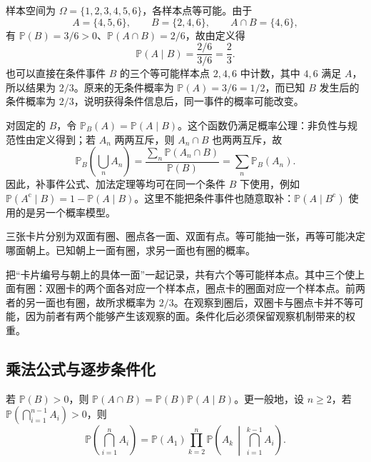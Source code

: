 \begin{solve}
样本空间为 $\Omega=\{1,2,3,4,5,6\}$，各样本点等可能。由于
\[
  A=\{4,5,6\},\qquad B=\{2,4,6\},\qquad A\cap B=\{4,6\},
\]
有 $\mathbb P(B)=3/6>0$、$\mathbb P(A\cap B)=2/6$，故由定义得
\[
  \mathbb P(A\mid B)=\frac{2/6}{3/6}=\frac23.
\]
也可以直接在条件事件 $B$ 的三个等可能样本点 $2,4,6$ 中计数，其中 $4,6$ 满足 $A$，所以结果为 $2/3$。原来的无条件概率为 $\mathbb P(A)=3/6=1/2$，而已知 $B$ 发生后的条件概率为 $2/3$，说明获得条件信息后，同一事件的概率可能改变。
\end{solve}

对固定的 $B$，令 $\mathbb P_B(A)=\mathbb P(A\mid B)$。这个函数仍满足概率公理：非负性与规范性由定义得到；若 $A_n$ 两两互斥，则 $A_n\cap B$ 也两两互斥，故
\[
 \mathbb P_B\!\left(\bigcup_n A_n\right)
 =\frac{\sum_n\mathbb P(A_n\cap B)}{\mathbb P(B)}
 =\sum_n\mathbb P_B(A_n).
\]
因此，补事件公式、加法定理等均可在同一个条件 $B$ 下使用，例如 $\mathbb P(A^{\mathrm c}\mid B)=1-\mathbb P(A\mid B)$。这里不能把条件事件也随意取补：$\mathbb P(A\mid B^{\mathrm c})$ 使用的是另一个概率模型。

\begin{example}
\label{ex:study-double-sided-cards}
三张卡片分别为双面有圈、圈点各一面、双面有点。等可能抽一张，再等可能决定哪面朝上。已知朝上一面有圈，求另一面也有圈的概率。
\end{example}

\begin{solve}
把“卡片编号与朝上的具体一面”一起记录，共有六个等可能样本点。其中三个使上面有圈：双圈卡的两个面各对应一个样本点，圈点卡的圈面对应一个样本点。前两者的另一面也有圈，故所求概率为 $2/3$。在观察到圈后，双圈卡与圈点卡并不等可能，因为前者有两个能够产生该观察的面。条件化后必须保留观察机制带来的权重。
\end{solve}

\subsection{乘法公式与逐步条件化}
\label{subsec:study-multiplication}

\begin{theorem}[概率的乘法公式]
\label{thm:study-multiplication}
若 $\mathbb P(B)>0$，则 $\mathbb P(A\cap B)=\mathbb P(B)\mathbb P(A\mid B)$。更一般地，设 $n\ge2$，若 $\mathbb P(\bigcap_{i=1}^{n-1}A_i)>0$，则
\begin{equation}
 \mathbb P\!\left(\bigcap_{i=1}^{n}A_i\right)
 =\mathbb P(A_1)\prod_{k=2}^{n}
 \mathbb P\!\left(A_k\,\middle|\,\bigcap_{i=1}^{k-1}A_i\right).
 \label{eq:study-chain-rule}
\end{equation}
\end{theorem}

